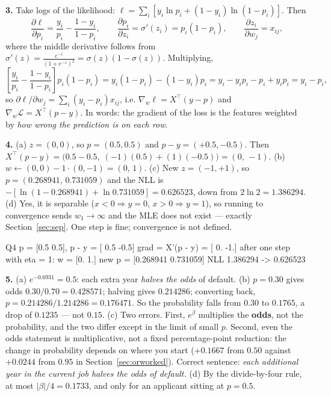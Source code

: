 \documentclass[11pt]{article}
\begin{document}
\medskip
\textbf{3.} Take logs of the likelihood:
$\ell = \sum_i [y_i \ln p_i + (1-y_i)\ln(1-p_i)]$. Then
\[
  \frac{\partial \ell}{\partial p_i} = \frac{y_i}{p_i} - \frac{1-y_i}{1-p_i},
  \qquad
  \frac{\partial p_i}{\partial z_i} = \sigma'(z_i) = p_i(1-p_i),
  \qquad
  \frac{\partial z_i}{\partial w_j} = x_{ij},
\]
where the middle derivative follows from
$\sigma'(z) = \frac{e^{-z}}{(1+e^{-z})^2} = \sigma(z)(1-\sigma(z))$.
Multiplying,
\[
  \left[\frac{y_i}{p_i} - \frac{1-y_i}{1-p_i}\right]p_i(1-p_i)
  = y_i(1-p_i) - (1-y_i)p_i
  = y_i - y_ip_i - p_i + y_ip_i = y_i - p_i,
\]
so $\partial \ell/\partial w_j = \sum_i (y_i - p_i)x_{ij}$, i.e.
$\nabla_w\ell = X^{\!\top}(y-p)$ and
$\nabla_w\mathcal{L} = X^{\!\top}(p-y)$. In words: the gradient of the loss is
the features weighted by \emph{how wrong the prediction is on each row}.

\medskip
\textbf{4.} (a) $z = (0,0)$, so $p = (0.5, 0.5)$ and
$p - y = (+0.5, -0.5)$. Then
$X^{\!\top}(p-y) = \bigl(0.5 - 0.5,\; (-1)(0.5) + (1)(-0.5)\bigr)
= (0,\, -1)$.
(b) $w \leftarrow (0,0) - 1\cdot(0,-1) = (0,\, 1)$.
(c) New $z = (-1, +1)$, so $p = (0.268941,\, 0.731059)$ and the NLL is
$-[\ln(1-0.268941) + \ln 0.731059] = 0.626523$, down from
$2\ln 2 = 1.386294$.
(d) Yes, it is separable ($x<0 \Rightarrow y=0$, $x>0 \Rightarrow y=1$), so
running to convergence sends $w_1 \to \infty$ and the MLE does not exist ---
exactly Section~\ref{sec:sep}. One step is fine; convergence is not defined.

\begin{codeout}
Q4  p = [0.5 0.5],  p - y = [ 0.5 -0.5]
    grad = X'(p - y) = [ 0. -1.]
    after one step with eta = 1: w = [0. 1.]
    new p = [0.268941 0.731059]
    NLL 1.386294 -> 0.626523
\end{codeout}

\medskip
\textbf{5.} (a) $e^{-0.6931} = 0.5$: each extra year \emph{halves the odds}
of default.
(b) $p = 0.30$ gives odds $0.30/0.70 = 0.428571$; halving gives $0.214286$;
converting back, $p = 0.214286/1.214286 = 0.176471$. So the probability falls
from $0.30$ to $0.1765$, a drop of $0.1235$ --- not $0.15$.
(c) Two errors. First, $e^{\beta}$ multiplies the \textbf{odds}, not the
probability, and the two differ except in the limit of small $p$. Second, even
the odds statement is multiplicative, not a fixed percentage-point reduction:
the change in probability depends on where you start ($+0.1667$ from $0.50$
against $+0.0244$ from $0.95$ in Section~\ref{sec:orworked}). Correct sentence:
\emph{each additional year in the current job halves the odds of default.}
(d) By the divide-by-four rule, at most $|\beta|/4 = 0.1733$, and only for an
applicant sitting at $p = 0.5$.
\end{document}
